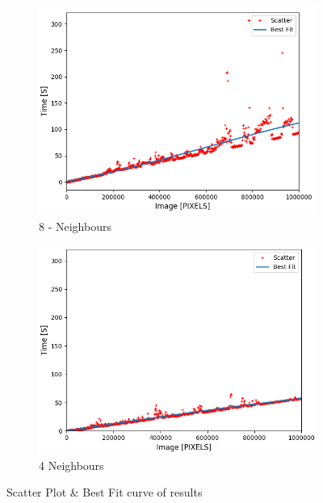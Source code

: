 \documentclass{article}
\begin{document}
\begin{figure}[ht]
\centering
\begin{subfigure}{.5\textwidth}
  \centering
  \includegraphics[width=\linewidth]{tests/performane_8.png}
  \caption{8 - Neighbours}
  \label{fig:sub1}
\end{subfigure}%
\begin{subfigure}{.5\textwidth}
  \centering
  \includegraphics[width=\linewidth]{tests/performance_4.png}
  \caption{4 Neighbours}
  \label{fig:sub2}
\end{subfigure}
\caption{Scatter Plot  \& Best Fit curve of results}
\label{fig:general_test}
\end{figure}
\end{document}
